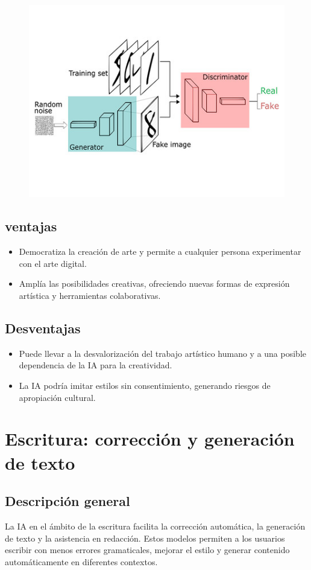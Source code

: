 \documentclass[12pt]{article}
\begin{document}
\begin{figure}[h!]
    \centering
    \includegraphics[width=.6\textwidth]{GAN.jpg}
    \label{fig:my_label}
\end{figure}

\subsection{ventajas}
\begin{itemize}
    \item Democratiza la creación de arte y permite a cualquier persona experimentar con el arte digital.
    \item Amplía las posibilidades creativas, ofreciendo nuevas formas de expresión artística y herramientas colaborativas.
\end{itemize}

\subsection{Desventajas}
\begin{itemize}
    \item Puede llevar a la desvalorización del trabajo artístico humano y a una posible dependencia de la IA para la creatividad.
    \item La IA podría imitar estilos sin consentimiento, generando riesgos de apropiación cultural.
\end{itemize}

\section{Escritura: corrección y generación de texto}
\subsection{Descripción general}
La IA en el ámbito de la escritura facilita la corrección automática, la generación de texto y la asistencia en redacción. 
Estos modelos permiten a los usuarios escribir con menos errores gramaticales, mejorar el estilo y generar contenido automáticamente 
en diferentes contextos.
\end{document}
